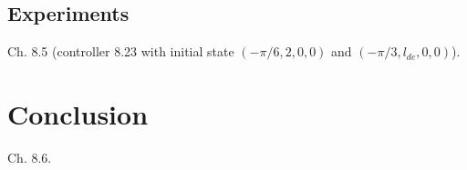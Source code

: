 \documentclass[a4paper]{article}
\begin{document}
\subsection{Experiments}
Ch. 8.5 (controller 8.23 with initial state $(-\pi/6, 2, 0, 0)$ and
$(-\pi/3, l_{de}, 0, 0)$).

\section{Conclusion}
Ch. 8.6.


\clearpage







\end{document}
